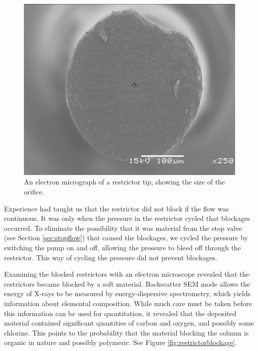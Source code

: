 \begin{figure}
\centering
\includegraphics[width=\textwidth]{Figures/sem_h_001.png}
\decoRule

\caption[A electron microscope photo of a restrictor orifice]{An electron
micrograph of a restrictor tip, showing the size of the orifice.}

\label{fig:restrictororifice}
\end{figure}

Experience had taught us that the restrictor did not block if the flow was
continuous. It was only when the pressure in the restrictor cycled that
blockages occurred. To eliminate the possibility that it was material from the
stop valve (see Section \ref{sec:stopflow}) that caused the blockages, we cycled
the pressure by switching the pump on and off, allowing the pressure to bleed
off through the restrictor. This way of cycling the pressure did not prevent
blockages.

Examining the blocked restrictors with an electron microscope revealed that the
restrictors became blocked by a soft material. Backscatter SEM mode allows the
energy of X-rays to be measured by energy-dispersive spectrometry, which yields
information about elemental composition. While much care must be taken before
this information can be used for quantitation, it revealed that the deposited
material contained significant quantities of carbon and oxygen, and possibly
some chlorine. This points to the probability that the material blocking the
column is organic in nature and possibly polymeric. See Figure
\ref{fig:restrictorblockage}.

